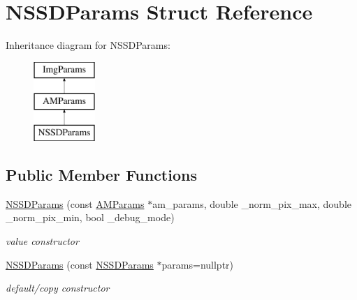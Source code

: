 \hypertarget{structNSSDParams}{\section{N\-S\-S\-D\-Params Struct Reference}
\label{structNSSDParams}
}
Inheritance diagram for N\-S\-S\-D\-Params\-:\begin{figure}[H]
\begin{center}
\leavevmode
\includegraphics[height=3.000000cm]{structNSSDParams}
\end{center}
\end{figure}
\subsection*{Public Member Functions}
\begin{DoxyCompactItemize}
\item 
\hypertarget{structNSSDParams_acd5af96c8a4656b49124db3c65307c59}{\hyperlink{structNSSDParams_acd5af96c8a4656b49124db3c65307c59}{N\-S\-S\-D\-Params} (const \hyperlink{structAMParams}{A\-M\-Params} $\ast$am\-\_\-params, double \-\_\-norm\-\_\-pix\-\_\-max, double \-\_\-norm\-\_\-pix\-\_\-min, bool \-\_\-debug\-\_\-mode)}\label{structNSSDParams_acd5af96c8a4656b49124db3c65307c59}

\begin{DoxyCompactList}\small\item\em value constructor \end{DoxyCompactList}\item 
\hypertarget{structNSSDParams_a5ac90a50027d4d8ba7fb1c1757e46444}{\hyperlink{structNSSDParams_a5ac90a50027d4d8ba7fb1c1757e46444}{N\-S\-S\-D\-Params} (const \hyperlink{structNSSDParams}{N\-S\-S\-D\-Params} $\ast$params=nullptr)}\label{structNSSDParams_a5ac90a50027d4d8ba7fb1c1757e46444}

\begin{DoxyCompactList}\small\item\em default/copy constructor \end{DoxyCompactList}\end{DoxyCompactItemize}
